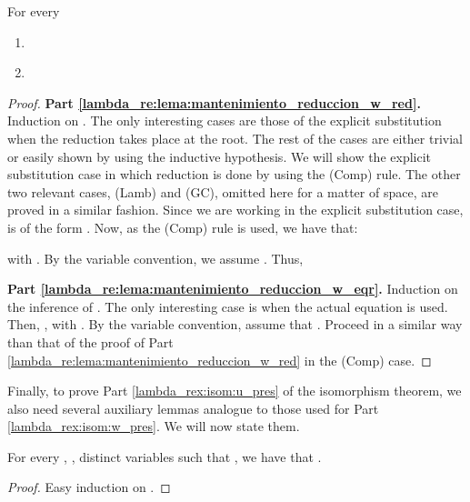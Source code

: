 \begin{lemma}\label{lambda_re:lema:mantenimiento_reduccion_w}
For every 
    \begin{enumerate}
        \item \label{lambda_re:lema:mantenimiento_reduccion_w_red} 

        \item \label{lambda_re:lema:mantenimiento_reduccion_w_eqr} 
    \end{enumerate}
    \begin{proof}
    \textbf{Part \ref{lambda_re:lema:mantenimiento_reduccion_w_red}.}
    Induction on . The only interesting cases are those of the explicit
    substitution when the reduction takes place at the root. The rest of the
    cases are either trivial or easily shown by using the inductive hypothesis.
We will show the explicit substitution case in which reduction is done
    by using the (Comp) rule. The other two relevant cases, (Lamb) and (GC),
    omitted here for a matter of space, are proved in a similar fashion. Since
    we are working in the explicit substitution case,  is of the form
    . Now, as the (Comp) rule is used, we have that:
    
    with . By the variable convention, we assume . Thus,
    
    
    
    
    
    
    







    \textbf{Part \ref{lambda_re:lema:mantenimiento_reduccion_w_eqr}.} 
    Induction on the inference of . The only interesting case is
    when the actual equation is used.  Then, , with .  By the variable convention,
    assume that .
Proceed in a similar way than that of the proof of Part
    \ref{lambda_re:lema:mantenimiento_reduccion_w_red} in the (Comp) case.
\end{proof}
\end{lemma}

Finally, to prove Part \ref{lambda_rex:isom:u_pres} of the isomorphism theorem,
we also need several auxiliary lemmas analogue to those used for Part
\ref{lambda_rex:isom:w_pres}. We will now state them.

\begin{lemma}\label{lambda_re:lema:u_swap}
For every , ,  distinct variables such that , we have that 
.
    \begin{proof}
    Easy induction on .
    \end{proof}
\end{lemma}

